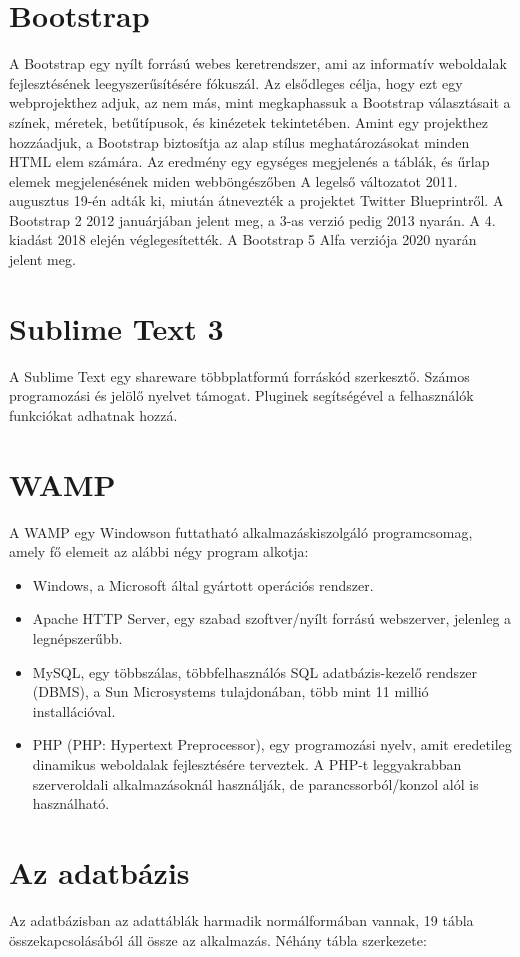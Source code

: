 \documentclass[
]{thesis-ekf}
\begin{document}
\section{Bootstrap}
A Bootstrap egy nyílt forrású webes keretrendszer, ami az informatív weboldalak fejlesztésének leegyszerűsítésére fókuszál. Az elsődleges célja, hogy ezt egy webprojekthez adjuk, az nem más, mint megkaphassuk a Bootstrap választásait a színek, méretek, betűtípusok, és kinézetek tekintetében.  Amint egy projekthez hozzáadjuk, a Bootstrap biztosítja az alap stílus meghatározásokat minden HTML elem számára. Az eredmény egy egységes megjelenés a táblák, és űrlap elemek megjelenésének miden webböngészőben
A legelső változatot 2011. augusztus 19-én adták ki, miután átnevezték a projektet Twitter Blueprintről. A Bootstrap 2 2012 januárjában jelent meg, a 3-as verzió pedig 2013 nyarán. A 4. kiadást 2018 elején véglegesítették. A Bootstrap 5 Alfa verziója 2020 nyarán jelent meg.
\section{Sublime Text 3}
A Sublime Text egy shareware többplatformú forráskód szerkesztő. Számos programozási és jelölő nyelvet támogat. Pluginek segítségével a felhasználók funkciókat adhatnak hozzá.
\section{WAMP}
A WAMP egy Windowson futtatható alkalmazáskiszolgáló programcsomag, amely fő elemeit az alábbi négy program alkotja:
\begin{itemize}
	\item Windows, a Microsoft által gyártott operációs rendszer.
	\item Apache HTTP Server, egy szabad szoftver/nyílt forrású webszerver, jelenleg a legnépszerűbb.
	\item MySQL, egy többszálas, többfelhasználós SQL adatbázis-kezelő rendszer (DBMS), a Sun Microsystems tulajdonában, több mint 11 millió installációval.
	\item PHP (PHP: Hypertext Preprocessor), egy programozási nyelv, amit eredetileg dinamikus weboldalak fejlesztésére terveztek. A PHP-t leggyakrabban szerveroldali alkalmazásoknál használják, de parancssorból/konzol alól is használható.
\end{itemize}

\section{Az adatbázis}
 Az adatbázisban az adattáblák harmadik normálformában vannak, 19 tábla összekapcsolásából áll össze az alkalmazás.
 Néhány tábla szerkezete:
\end{document}
